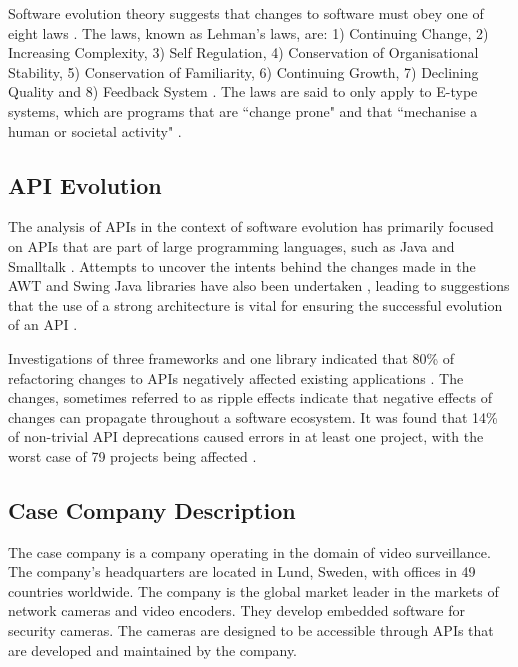 \documentclass{sig-alternate}
\begin{document}
Software evolution theory suggests that changes to software must obey one of eight laws \cite{lehman1980programs}. The laws, known as Lehman's laws, are: 1) Continuing Change, 2) Increasing Complexity, 3) Self Regulation, 4) Conservation of Organisational Stability, 5) Conservation of Familiarity, 6) Continuing Growth, 7) Declining Quality and 8) Feedback System \cite{lehman1980programs}. The laws are said to only apply to E-type systems, which are programs that are ``change prone" and that ``mechanise a human or societal activity" \cite{lehman1980programs}.     

\subsection{API Evolution} \label{related_work}
The analysis of APIs in the context of software evolution has primarily focused on APIs that are part of large programming languages, such as Java \cite{hou2011exploring} \cite{shi2011empirical} and Smalltalk \cite{robbes2012developers}. Attempts to uncover the intents behind the changes made in the AWT and Swing Java libraries have also been undertaken \cite{hou2011exploring}, leading to suggestions that the use of a strong architecture is vital for ensuring the successful evolution of an API \cite{hou2011exploring}.

Investigations of three frameworks and one library indicated that 80\% of refactoring changes to APIs negatively affected existing applications \cite{dig2005role}. The changes, sometimes referred to as ripple effects \cite{robbes2012developers} indicate that negative effects of changes can propagate throughout a software ecosystem. It was found that 14\% of non-trivial API deprecations caused errors in at least one project, with the worst case of 79 projects being affected \cite{robbes2012developers}.




\subsection{Case Company Description} \label{case_company_description}
The case company is a company operating in the domain of video surveillance. The company's headquarters are located in Lund, Sweden, with offices in 49 countries worldwide. The company is the global market leader in the markets of network cameras and video encoders. They develop embedded software for security cameras. The cameras are designed to be accessible through APIs that are developed and maintained by the company. 
\end{document}
